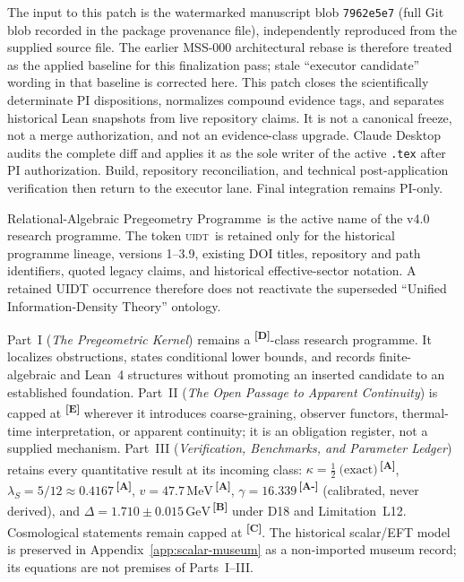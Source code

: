 \documentclass[12pt,a4paper,twoside]{article}
\theoremstyle{plain}
\theoremstyle{definition}
\theoremstyle{remark}
\newcommand{\ProjectName}{Relational-Algebraic Pregeometry Programme}
\newcommand{\UIDT}{\textsc{uidt}} %
\newcommand{\GeV}{\,\mathrm{GeV}}
\newcommand{\MeV}{\,\mathrm{MeV}}
\newcommand{\catmark}[1]{\textsuperscript{\textsf{\textbf{[#1]}}}}
\newcommand{\lambdaS}{5/12 \approx 0.4167} %
\newcommand{\DeltaGap}{1.710 \pm 0.015\GeV} %
\newcommand{\GammaGeom}{16.339} %
\newcommand{\vVEV}{47.7\MeV} %
\newcommand{\KappaRG}{\tfrac{1}{2}\ \text{(exact)}} %
\begin{document}
\thispagestyle{uidtontology}

\begin{governancebox}
The input to this patch is the watermarked manuscript blob
\texttt{7962e5e7} (full Git blob recorded in the package provenance file),
independently reproduced from the supplied source file. The earlier MSS-000 architectural rebase is
therefore treated as the applied baseline for this finalization pass; stale
``executor candidate'' wording in that baseline is corrected here. This
patch closes the scientifically determinate PI dispositions, normalizes
compound evidence tags, and separates historical Lean snapshots from live
repository claims. It is not a canonical freeze, not a merge authorization,
and not an evidence-class upgrade. Claude Desktop audits the complete diff
and applies it as the sole writer of the active \texttt{.tex} after PI
authorization. Build, repository reconciliation, and technical
post-application verification then return to the executor lane. Final
integration remains PI-only.
\end{governancebox}

\begin{governancebox}
\ProjectName\ is the active name of the v4.0 research programme. The token
\UIDT\ is retained only for the historical programme lineage, versions
1--3.9, existing DOI titles, repository and path identifiers, quoted legacy
claims, and historical effective-sector notation. A retained UIDT occurrence
therefore does not reactivate the superseded ``Unified Information-Density
Theory'' ontology.
\end{governancebox}


\begin{evidencebox}{}
Part~I (\emph{The Pregeometric Kernel}) remains a \catmark{D}-class research
programme. It localizes obstructions, states conditional lower bounds, and
records finite-algebraic and Lean~4 structures without promoting an inserted
candidate to an established foundation. Part~II (\emph{The Open Passage to
Apparent Continuity}) is capped at \catmark{E} wherever it introduces
coarse-graining, observer functors, thermal-time interpretation, or apparent
continuity; it is an obligation register, not a supplied mechanism. Part~III
(\emph{Verification, Benchmarks, and Parameter Ledger}) retains every
quantitative result at its incoming class: $\kappa=\KappaRG$\,\catmark{A},
$\lambda_S=\lambdaS$\,\catmark{A}, $v=\vVEV$\,\catmark{A},
$\gamma=\GammaGeom$\,\catmark{A-} (calibrated, never derived), and
$\Delta=\DeltaGap$\,\catmark{B} under D18 and Limitation~L12. Cosmological
statements remain capped at \catmark{C}. The historical scalar/EFT model is
preserved in Appendix~\ref{app:scalar-museum} as a non-imported museum record;
its equations are not premises of Parts~I--III.
\end{evidencebox}
\end{document}
